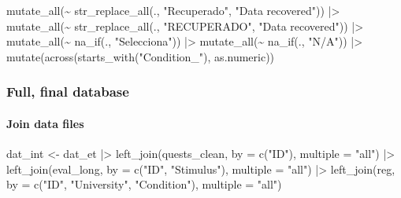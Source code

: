 \documentclass[
  bookmarksnumbered]{article}
\newenvironment{Shaded}{\begin{snugshade}}{\end{snugshade}}
\newcommand{\AttributeTok}[1]{\textcolor[rgb]{0.80,0.80,0.80}{#1}}
\newcommand{\FunctionTok}[1]{\textcolor[rgb]{0.94,0.94,0.56}{#1}}
\newcommand{\NormalTok}[1]{\textcolor[rgb]{0.80,0.80,0.80}{#1}}
\newcommand{\OtherTok}[1]{\textcolor[rgb]{0.94,0.94,0.56}{#1}}
\newcommand{\SpecialCharTok}[1]{\textcolor[rgb]{0.86,0.64,0.64}{#1}}
\newcommand{\StringTok}[1]{\textcolor[rgb]{0.80,0.58,0.58}{#1}}
\begin{document}
\begin{Shaded}
\begin{Highlighting}[]
  \FunctionTok{mutate\_all}\NormalTok{(}\SpecialCharTok{\textasciitilde{}} \FunctionTok{str\_replace\_all}\NormalTok{(., }\StringTok{"Recuperado"}\NormalTok{, }\StringTok{"Data recovered"}\NormalTok{)) }\SpecialCharTok{|\textgreater{}}
  \FunctionTok{mutate\_all}\NormalTok{(}\SpecialCharTok{\textasciitilde{}} \FunctionTok{str\_replace\_all}\NormalTok{(., }\StringTok{"RECUPERADO"}\NormalTok{, }\StringTok{"Data recovered"}\NormalTok{)) }\SpecialCharTok{|\textgreater{}}
  \FunctionTok{mutate\_all}\NormalTok{(}\SpecialCharTok{\textasciitilde{}} \FunctionTok{na\_if}\NormalTok{(., }\StringTok{"Selecciona"}\NormalTok{)) }\SpecialCharTok{|\textgreater{}}
  \FunctionTok{mutate\_all}\NormalTok{(}\SpecialCharTok{\textasciitilde{}} \FunctionTok{na\_if}\NormalTok{(., }\StringTok{"N/A"}\NormalTok{)) }\SpecialCharTok{|\textgreater{}}
  \FunctionTok{mutate}\NormalTok{(}\FunctionTok{across}\NormalTok{(}\FunctionTok{starts\_with}\NormalTok{(}\StringTok{"Condition\_"}\NormalTok{), as.numeric))}
\end{Highlighting}
\end{Shaded}

\subsubsection{Full, final database}\label{full-final-database}

\paragraph{Join data files}\label{join-data-files}

\begin{Shaded}
\begin{Highlighting}[]
\NormalTok{dat\_int }\OtherTok{\textless{}{-}}\NormalTok{ dat\_et }\SpecialCharTok{|\textgreater{}}
  \FunctionTok{left\_join}\NormalTok{(quests\_clean, }\AttributeTok{by =} \FunctionTok{c}\NormalTok{(}\StringTok{"ID"}\NormalTok{), }\AttributeTok{multiple =} \StringTok{"all"}\NormalTok{) }\SpecialCharTok{|\textgreater{}}
  \FunctionTok{left\_join}\NormalTok{(eval\_long, }\AttributeTok{by =} \FunctionTok{c}\NormalTok{(}\StringTok{"ID"}\NormalTok{, }\StringTok{"Stimulus"}\NormalTok{), }\AttributeTok{multiple =} \StringTok{"all"}\NormalTok{) }\SpecialCharTok{|\textgreater{}}
  \FunctionTok{left\_join}\NormalTok{(reg, }\AttributeTok{by =} \FunctionTok{c}\NormalTok{(}\StringTok{"ID"}\NormalTok{, }\StringTok{"University"}\NormalTok{, }\StringTok{"Condition"}\NormalTok{), }\AttributeTok{multiple =} \StringTok{"all"}\NormalTok{)}
\end{Highlighting}
\end{Shaded}
\end{document}
